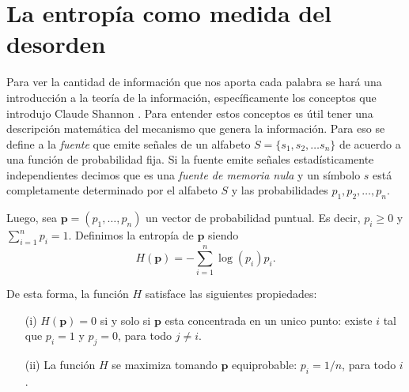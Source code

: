 \section{La entropía como medida del desorden}
\label{sub:entropiaShannon}

Para ver la cantidad de información que nos aporta cada palabra se hará una introducción a la teoría de la información, específicamente
los conceptos que introdujo Claude Shannon \cite{shannon2001mathematical,abramson1963information}.
Para entender estos conceptos es útil tener una descripción matemática del mecanismo que genera la información. Para eso se define a 
la \textit{fuente} que emite señales de un alfabeto $ S = \{s_1, s_2, \dotsc s_n\}$ de acuerdo a una función de probabilidad fija.
Si la fuente emite señales estadísticamente independientes decimos que es una \textit{fuente de memoria nula} y un símbolo $s$ está completamente determinado por el alfabeto $S$ y las probabilidades $p_1, p_2, \dots , p_n$.








Luego, sea $\mathbf{p}=(p_1,\ldots, p_n)$ un vector de probabilidad puntual. Es decir, $p_i\geq 0$ y $\sum_{i=1}^np_i=1$. 
Definimos la entropía de $\mathbf{p}$ siendo
\begin{equation}
H(\mathbf{p})=-\sum_{i=1}^n \log(p_i)p_i.
\end{equation}

De esta forma, la funci\'on  $H$ satisface las siguientes propiedades: 

\begin{itemize}
\item[(i)] $H(\mathbf{p})=0$ si y solo si $\mathbf{p}$ esta concentrada en un unico punto: existe $i$ tal que $p_i=1$ y $p_j=0$, para todo $j\not=i$. 

\item[(ii)] La funci\'on $H$ se maximiza tomando $\mathbf{p}$ equiprobable: 
$p_i=1/n$, para todo $i$. 

\end{itemize}

